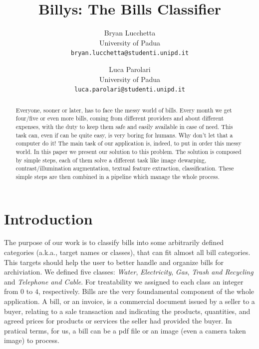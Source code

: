 \documentclass[10pt,twocolumn,letterpaper]{article}
\begin{document}
\title{Billys: The Bills Classifier}

\author{Bryan Lucchetta\\
{\small University of Padua}\\
{\tt\small bryan.lucchetta@studenti.unipd.it}
\and
Luca Parolari\\
{\small University of Padua}\\
{\tt\small luca.parolari@studenti.unipd.it}
}

\maketitle


\begin{abstract}
Everyone, sooner or later, has to face the messy world of bills. Every
month we get four/five or even more bills, coming from different
providers and about different expenses, with the duty to keep them
safe and easily available in case of need. This task can, even if can
be quite easy, is very boring for humans. Why don't let that a
computer do it! The main task of our application is, indeed, to put in
order this messy world.  In this paper we present our solution to this
problem. The solution is composed by simple steps, each of them solve
a different task like image dewarping, contrast/illumination
augmentation, textual feature extraction, classification. These simple
steps are then combined in a pipeline which manage the whole process.
\end{abstract}


\section{Introduction}

The purpose of our work is to classify bills into some arbitrarily
defined categories (a.k.a., target names or classes), that can
fit almost all bill categories. This targets should help the user to
better handle and organize bills for archiviation. We defined five
classes: \emph{Water}, \emph{Electricity}, \emph{Gas}, \emph{Trash and
  Recycling} and \emph{Telephone and Cable}. For treatability we
assigned to each class an integer from $0$ to $4$,
respectively. Bills are the very foundamental component of the whole
application. A bill, or an invoice, is a commercial document issued by
a seller to a buyer, relating to a sale transaction and indicating the
products, quantities, and agreed prices for products or services the
seller had provided the buyer. In pratical terms, for us, a bill can
be a pdf file or an image (even a camera taken image) to process.
\end{document}
